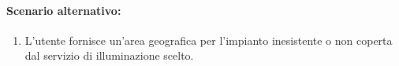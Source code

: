 \paragraph{Scenario alternativo:}
\begin{enumerate}
    \item L'utente fornisce un'area geografica per l'impianto inesistente o non coperta dal servizio di illuminazione scelto.
\end{enumerate}
